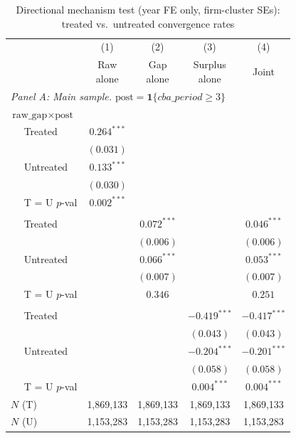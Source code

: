 \begin{table}[H]
\centering
\caption{Directional mechanism test (year FE only, firm-cluster SEs): treated vs.\ untreated convergence rates}
\label{tab:mechanism_test_directional_yearonly_firmcluster}
\scriptsize
\begin{tabular}{lcccc}
\toprule\toprule
 & (1) & (2) & (3) & (4) \\
 & \shortstack{Raw \\ alone} & \shortstack{Gap \\ alone} & \shortstack{Surplus \\ alone} & Joint \\
\midrule
\multicolumn{5}{l}{\textit{Panel A: Main sample. $\text{post} = \mathbf{1}\{cba\_period \geq 3\}$}} \\
\midrule
\multicolumn{5}{l}{$\text{raw\_gap} \times \text{post}$} \\
$\quad$ Treated & $0.264^{***}$ &  &  &  \\
 & $(0.031)$ &  &  &  \\
$\quad$ Untreated & $0.133^{***}$ &  &  &  \\
 & $(0.030)$ &  &  &  \\
$\quad$ T = U $p$-val & $0.002^{***}$ &  &  &  \\
\addlinespace[2pt]
\multicolumn{5}{l}{$\text{gap} \times \text{post}$} \\
$\quad$ Treated &  & $0.072^{***}$ &  & $0.046^{***}$ \\
 &  & $(0.006)$ &  & $(0.006)$ \\
$\quad$ Untreated &  & $0.066^{***}$ &  & $0.053^{***}$ \\
 &  & $(0.007)$ &  & $(0.007)$ \\
$\quad$ T = U $p$-val &  & $0.346$ &  & $0.251$ \\
\addlinespace[2pt]
\multicolumn{5}{l}{$\text{surplus} \times \text{post}$} \\
$\quad$ Treated &  &  & $-0.419^{***}$ & $-0.417^{***}$ \\
 &  &  & $(0.043)$ & $(0.043)$ \\
$\quad$ Untreated &  &  & $-0.204^{***}$ & $-0.201^{***}$ \\
 &  &  & $(0.058)$ & $(0.058)$ \\
$\quad$ T = U $p$-val &  &  & $0.004^{***}$ & $0.004^{***}$ \\
\addlinespace[2pt]
$N$ (T) & 1,869,133 & 1,869,133 & 1,869,133 & 1,869,133 \\
$N$ (U) & 1,153,283 & 1,153,283 & 1,153,283 & 1,153,283 \\

\end{tabular}
\end{table}
